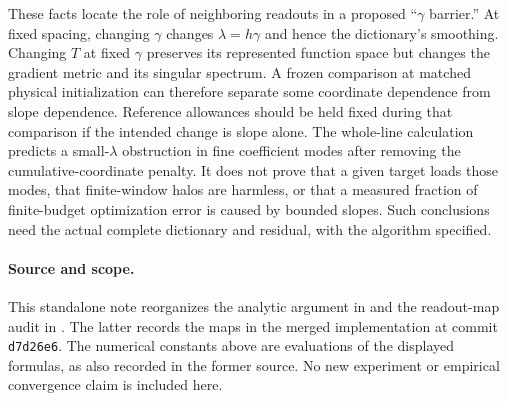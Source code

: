 \documentclass[11pt]{article}
\theoremstyle{remark}
\begin{document}
These facts locate the role of neighboring readouts in a proposed
``$\gamma$ barrier.''  At fixed spacing, changing $\gamma$ changes
$\lambda=h\gamma$ and hence the dictionary's smoothing.  Changing
$T$ at fixed $\gamma$ preserves its represented function space but
changes the gradient metric and its singular spectrum.  A frozen
comparison at matched physical initialization can therefore separate
some coordinate dependence from slope dependence.  Reference
allowances should be held fixed during that comparison if the intended
change is slope alone.  The whole-line calculation predicts a
small-$\lambda$ obstruction in fine coefficient modes after removing
the cumulative-coordinate penalty.  It does not prove that a given
target loads those modes, that finite-window halos are harmless, or
that a measured fraction of finite-budget optimization error is caused
by bounded slopes.  Such conclusions need the actual complete
dictionary and residual, with the algorithm specified.

\paragraph{Source and scope.}
This standalone note reorganizes the analytic argument in
 and the readout-map
audit in
.
The latter records the maps in the merged implementation at commit
\texttt{d7d26e6}.  The numerical constants above are evaluations of the
displayed formulas, as also recorded in the former source.  No new
experiment or empirical convergence claim is included here.
\end{document}
